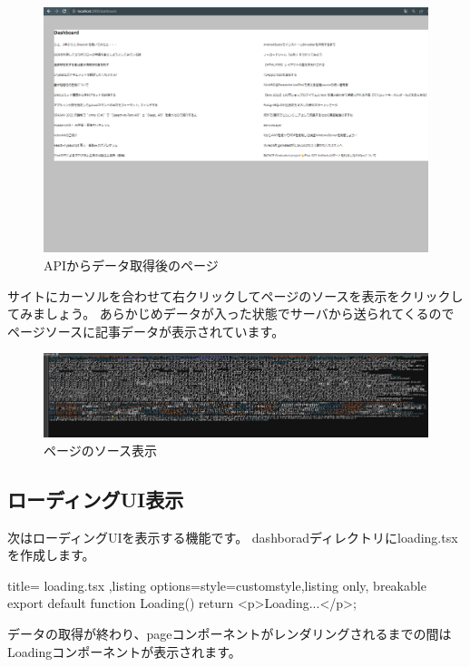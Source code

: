 \begin{figure}[H]
  \centering
  \includegraphics[width=12cm]{./image/03-Tech/chap4/06.png}
  \caption{APIからデータ取得後のページ}
\end{figure}


サイトにカーソルを合わせて右クリックしてページのソースを表示をクリックしてみましょう。
あらかじめデータが入った状態でサーバから送られてくるのでページソースに記事データが表示されています。

\begin{figure}[H]
  \centering
  \includegraphics[width=12cm]{./image/03-Tech/chap4/05.png}
  \caption{ページのソース表示}
\end{figure}

\subsection{ローディングUI表示}

次はローディングUIを表示する機能です。
dashboradディレクトリにloading.tsxを作成します。

\begin{tcblisting}{title={
        loading.tsx
      },listing options={style=customstyle},listing only, breakable}
  export default function Loading() {
    return <p>Loading...</p>;
  }
\end{tcblisting}


データの取得が終わり、pageコンポーネントがレンダリングされるまでの間はLoadingコンポーネントが表示されます。

